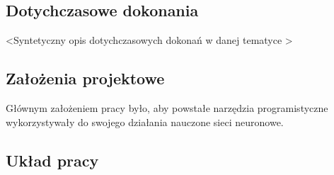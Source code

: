   \subsection{Dotychczasowe dokonania}
    \tab \textless Syntetyczny opis dotychczasowych dokonań w danej tematyce
    \textgreater

  \subsection{Założenia projektowe}
    \tab Głównym założeniem pracy było, aby powstałe narzędzia programistyczne
    wykorzystywały do swojego działania nauczone sieci neuronowe.

  \subsection{Układ pracy}
